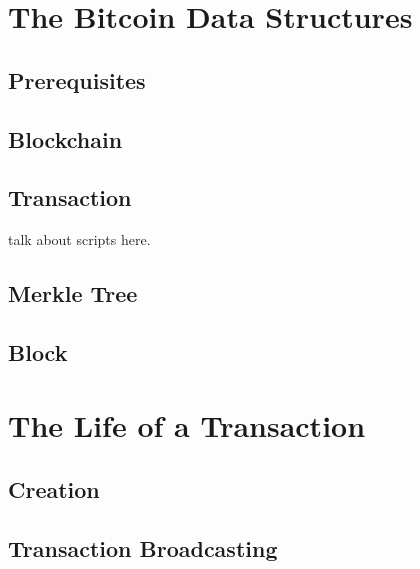 \documentclass{beamer}
\begin{document}
\section{The Bitcoin Data Structures}
\subsection{Prerequisites}

\begin{frame}
\end{frame}

\subsection{Blockchain}

\begin{frame}
\end{frame}

\subsection{Transaction}
\begin{frame}
    talk about scripts here.
\end{frame}
\subsection{Merkle Tree}
\subsection{Block}

\section{The Life of a Transaction}
\subsection{Creation}

\begin{frame}
\end{frame}

\subsection{Transaction Broadcasting}

\begin{frame}
\end{frame}
\end{document}
